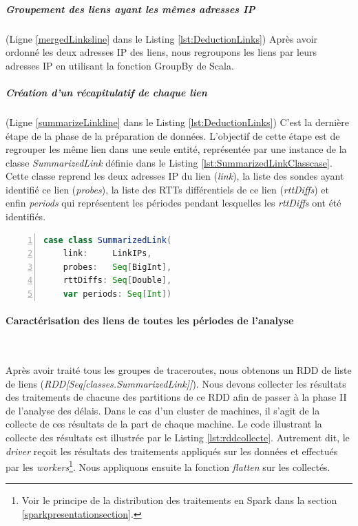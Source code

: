 \subparagraph{Groupement des liens ayant les mêmes adresses IP} (Ligne \ref{mergedLinksline} dans le Listing \ref{lst:DeductionLinks})
Après avoir ordonné les deux adresses IP des liens, nous regroupons les liens par leurs adresses IP en utilisant la fonction GroupBy de Scala.

\subparagraph{Création d'un récapitulatif de chaque lien} (Ligne \ref{summarizeLinkline} dans le Listing \ref{lst:DeductionLinks})
C'est la dernière étape de la phase de la préparation de données.  L'objectif de cette étape est de regrouper les même lien dans une seule entité, représentée par une instance de la classe \textit{SummarizedLink} définie dans le Listing \ref{lst:SummarizedLinkClasscase}.
 Cette classe reprend les deux  adresses IP du lien (\textit{link}), la liste des sondes ayant identifié ce lien (\textit{probes}), la liste des RTTs différentiels de ce lien (\textit{rttDiffs}) et enfin  \textit{periods} qui  représentent les périodes  pendant lesquelles les \textit{rttDiffs} ont été identifiés. 


\begin{lstlisting}[language=scala,firstnumber=1, caption={Définition de la classe SummarizedLink},label={lst:SummarizedLinkClasscase}, basicstyle = \footnotesize,escapechar=|,numbers=left,
stepnumber=1]
case class SummarizedLink(
	link:     LinkIPs,
	probes:   Seq[BigInt],
	rttDiffs: Seq[Double],
	var periods: Seq[Int])
\end{lstlisting}


\paragraph{Caractérisation des liens de toutes les périodes de l'analyse}~

Après avoir traité tous les groupes de traceroutes, nous obtenons un RDD de liste de liens (\textit{RDD[Seq[classes.SummarizedLink]]}). Nous devons collecter les résultats des traitements de chacune des partitions de ce RDD afin de passer à la phase II de l'analyse des délais. Dans le cas d'un cluster de machines, il s'agit de la collecte de ces résultats de la part de chaque machine.  
Le code illustrant la collecte des résultats est illustrée par le Listing \ref{lst:rddcollecte}. Autrement dit, le \textit{driver}  reçoit les résultats des traitements appliqués sur les données et effectués par les \textit{workers}\footnote{Voir le principe de la distribution des traitements en Spark dans la section \ref{sparkpresentationsection}.}. Nous appliquons ensuite la fonction \textit{flatten} sur les collectés.

